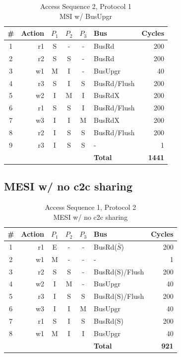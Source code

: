 \documentclass[12pt, letterpaper]{report}
\begin{document}
\begin{table}[H]
	\centering
	\begin{tabular}{ |c|r|c|c|c|l|r| }
		\hline
		\textbf{\#} & \textbf{Action} & \textbf{$P_1$} & \textbf{$P_{2}$} & \textbf{$P_3$} & \textbf{Bus} & \textbf{Cycles} \\
		\hline
		1 & r1 & S & - & - & BusRd & 200 \\
		\hline
		2 & r2 & S & S & - & BusRd & 200 \\
		\hline
		3 & w1 & M & I & - & BusUpgr & 40 \\
		\hline
		4 & r3 & S & I & S & BusRd/Flush & 200 \\
		\hline
		5 & w2 & I & M & I & BusRdX & 200 \\
		\hline
		6 & r1 & S & S & I & BusRd/Flush & 200 \\
		\hline
		7 & w3 & I & I & M & BusRdX & 200 \\
		\hline
		8 & r2 & I & S & S & BusRd/Flush & 200 \\
		\hline
		9 & r3 & I & S & S & - & 1 \\
		\hline \hline \hline
		\cellcolor{null} & \cellcolor{null} & \cellcolor{null} & \cellcolor{null} & \cellcolor{null} & \textbf{Total} & \textbf{1441} \\
		\hline
	\end{tabular}
	\caption{Access Sequence 2, Protocol 1\\MSI w/ BusUpgr}
\end{table}


\subsection{MESI w/ no c2c sharing}

\begin{table}[H]
	\setlength{\extrarowheight}{.5ex}
	\centering
	\begin{tabular}{ |c|r|c|c|c|l|r| }
		\hline
		\textbf{\#} & \textbf{Action} & \textbf{$P_1$} & \textbf{$P_{2}$} & \textbf{$P_3$} & \textbf{Bus} & \textbf{Cycles} \\
		\hline
		1 & r1 & E & - & - & BusRd($\bar{S}$) & 200 \\
		\hline
		2 & w1 & M & - & - & - & 1 \\
		\hline
		3 & r2 & S & S & - & BusRd(S)/Flush & 200 \\
		\hline
		4 & w2 & I & M & - & BusUpgr & 40 \\
		\hline
		5 & r3 & I & S & S & BusRd(S)/Flush & 200 \\
		\hline
		6 & w3 & I & I & M & BusUpgr & 40 \\
		\hline
		7 & r1 & S & I & S & BusRd(S) & 200 \\
		\hline
		8 & w1 & M & I & I & BusUpgr & 40 \\
		\hline \hline \hline
		\cellcolor{null} & \cellcolor{null} & \cellcolor{null} & \cellcolor{null} & \cellcolor{null} & \textbf{Total} & \textbf{921} \\
		\hline
	\end{tabular}
	\caption{Access Sequence 1, Protocol 2\\MESI w/ no c2c sharing}
\end{table}
\end{document}

